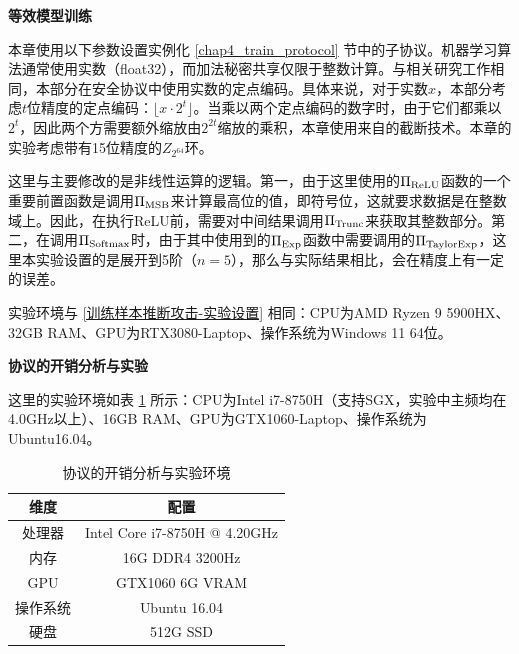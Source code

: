 \textbf{等效模型训练}

本章使用以下参数设置实例化 \ref{chap4_train_protocol} 节中的子协议。机器学习算法通常使用实数（float32），而加法秘密共享仅限于整数计算。与相关研究工作相同\cite{secureml, aby3, cryptgpu, secgnn}，本部分在安全协议中使用实数的定点编码。具体来说，对于实数$x$，本部分考虑$t$位精度的定点编码：$\lfloor x\cdot 2^t\rfloor$。当乘以两个定点编码的数字时，由于它们都乘以$2^t$，因此两个方需要额外缩放由$2^{2t}$缩放的乘积，本章使用来自\cite{secureml}的截断技术。本章的实验考虑带有15位精度的$Z_{2^{64}}$环。%

这里与主要修改的是非线性运算的逻辑。第一，由于这里使用的$\Pi_{\rm ReLU}$函数的一个重要前置函数是调用$\Pi_{\rm MSB}$来计算最高位的值，即符号位，这就要求数据是在整数域上。因此，在执行ReLU前，需要对中间结果调用$\Pi_{\rm Trunc}$来获取其整数部分。第二，在调用$\Pi_{\rm Softmax}$时，由于其中使用到的$\Pi_{\rm Exp}$函数中需要调用的$\Pi_{\rm TaylorExp}$，这里本实验设置的是展开到5阶（$n=5$），那么与实际结果相比，会在精度上有一定的误差。

实验环境与 \ref{训练样本推断攻击-实验设置} 相同：CPU为AMD Ryzen 9 5900HX、32GB RAM、GPU为RTX3080-Laptop、操作系统为Windows 11 64位。

%		

\textbf{协议的开销分析与实验}

这里的实验环境如表 \ref{chap4_exp2_env} 所示：CPU为Intel i7-8750H（支持SGX，实验中主频均在4.0GHz以上）、16GB RAM、GPU为GTX1060-Laptop、操作系统为Ubuntu16.04。

\begin{table}[]
	\centering
	\caption{协议的开销分析与实验环境}
	\begin{tabular}{|c|c|}
		\hline
		维度&配置
		\\ \hline
		
		处理器&Intel Core i7-8750H @ 4.20GHz    \\ \hline
		内存&16G DDR4 3200Hz    \\ \hline
		GPU&GTX1060 6G VRAM    \\ \hline
		操作系统&Ubuntu 16.04    \\ \hline
		硬盘&512G SSD    \\ \hline
	\end{tabular}
	\label{chap4_exp2_env}
\end{table}


